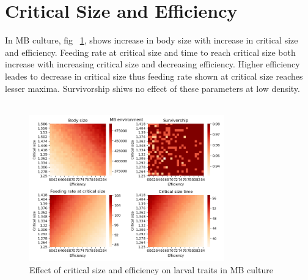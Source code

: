 \section{Critical Size and Efficiency}
In MB culture, fig ~\ref{fig:cs vs eff mb}, shows increase in body size with increase in critical size and efficiency. Feeding rate at critical size and time to reach critical size both increase with increasing critical size and decreasing efficiency. Higher efficiency leades to decrease in critical size thus feeding rate shown at critical size reaches lesser maxima. Survivorship shiws no effect of these parameters at low density.\\ \\
\begin{figure}[h]
  \centering
  \includegraphics[width=0.75\textwidth]{C3/Figs/Critical size_vs_Efficiency_MB}
  \caption{Effect of critical size and efficiency on larval traits in MB culture}
  \label{fig:cs vs eff mb}
\end{figure}\\
